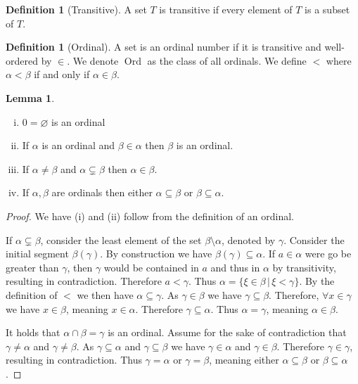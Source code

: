 \documentclass{article}
\theoremstyle{definition}
\newtheorem{defn}[thm]{Definition}
\newtheorem{lmma}[thm]{Lemma}
\newcommand*{\mtset}{\ensuremath{\varnothing}}
\DeclareMathOperator{\Ord}{Ord}
\begin{document}
\begin{defn}[Transitive]
    A set $T$ is transitive if every element of $T$ is a subset of $T$.
\end{defn}

\begin{defn}[Ordinal]
    A set is an ordinal number if it is transitive and well-ordered by $\in$. We denote $\Ord$ as the class of all ordinals. We define $<$ where $\alpha < \beta$ if and only if $\alpha \in \beta$.
\end{defn}

\begin{lmma}
    \hfill
    \begin{enumerate}[(i)]
        \item $0 = \mtset$ is an ordinal
        \item If $\alpha$ is an ordinal and $\beta \in \alpha$ then $\beta$ is an ordinal.
        \item If $\alpha \ne \beta$ and $\alpha \subsetneq \beta$ then $\alpha \in \beta$.
        \item If $\alpha, \beta$ are ordinals then either $\alpha \subseteq \beta$ or $\beta \subseteq \alpha$.
    \end{enumerate}
\end{lmma}

\begin{proof}
    We have (i) and (ii) follow from the definition of an ordinal. 

    If $\alpha \subsetneq \beta$, consider the least element of the set $\beta \setminus \alpha$, denoted by $\gamma$. Consider the initial segment $\beta(\gamma)$. By construction we have $\beta(\gamma) \subseteq \alpha$. If $a \in \alpha$ were go be greater than $\gamma$, then $\gamma$ would be contained in $a$ and thus in $\alpha$ by transitivity, resulting in contradiction. Therefore $a < \gamma$. Thus $\alpha = \{\xi \in \beta \, | \, \xi < \gamma\}$. By the definition of $<$ we then have $\alpha \subseteq \gamma$. As $\gamma \in \beta$ we have $\gamma \subseteq \beta$. Therefore, $\forall x \in \gamma$ we have $x \in \beta$, meaning $x \in \alpha$. Therefore $\gamma \subseteq \alpha$. Thus $\alpha = \gamma$, meaning $\alpha \in \beta$.

    It holds that $\alpha \cap \beta = \gamma$ is an ordinal. Assume for the sake of contradiction that $\gamma \ne \alpha$ and $\gamma \ne \beta$. As $\gamma \subseteq \alpha$ and $\gamma \subseteq \beta$ we have $\gamma \in \alpha$ and $\gamma \in \beta$. Therefore $\gamma \in \gamma$, resulting in contradiction. Thus $\gamma = \alpha$ or $\gamma = \beta$, meaning either $\alpha \subseteq \beta$ or $\beta \subseteq \alpha$.
\end{proof}
\end{document}
